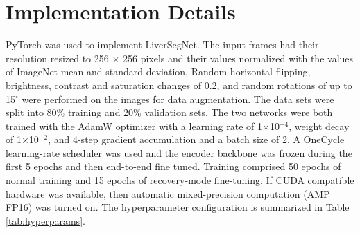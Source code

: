 \documentclass[conference]{IEEEtran}
\begin{document}
\section{Implementation Details}
PyTorch was used to implement LiverSegNet. The input frames had their resolution resized to 256 $\times$ 256 pixels and their values normalized with the values of ImageNet mean and standard deviation. Random horizontal flipping, brightness, contrast and saturation changes of 0.2, and random rotations of up to 15$^\circ$ were performed on the images for data augmentation. The data sets were split into 80\% training and 20\% validation sets. The two networks were both trained with the AdamW optimizer with a learning rate of 1$\times$10$^{-4}$, weight decay of 1$\times$10$^{-2}$, and 4-step gradient accumulation and a batch size of 2. A OneCycle learning-rate scheduler was used and the encoder backbone was frozen during the first 5 epochs and then end-to-end fine tuned. Training comprised 50 epochs of normal training and 15 epochs of recovery-mode fine-tuning. If CUDA compatible hardware was available, then automatic mixed-precision computation (AMP FP16) was turned on. The hyperparameter configuration is summarized in Table \ref{tab:hyperparams}.

\begin{table}[htbp]
\caption{System Hyperparameter Configuration}
\label{tab:hyperparams}
\centering
\renewcommand{\arraystretch}{1.45}
\end{table}
\end{document}
